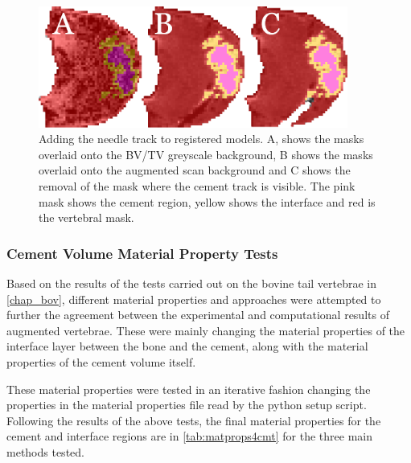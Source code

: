 \begin{figure}[ht!]
  \centering
  \includegraphics[width=4in]{Chapters/Chapter_HT_images/needle_track.png}
  \caption[Adding the needle track to registered models.]{Adding the needle
track to registered models. A, shows the masks
overlaid onto the BV/TV greyscale background, B shows the masks overlaid onto
the augmented scan background and C shows the removal of the mask where the
cement track is visible. The pink mask shows the cement region, yellow shows
the
interface and red is the vertebral mask.}
  \label{fig:needle_track}
\end{figure}

\subsubsection{Cement Volume Material Property Tests} \label{sec:cemmatprop}

Based on the results of the tests carried out on the bovine tail vertebrae in
\cref{chap_bov}, different material properties and approaches were attempted to
further the agreement between the experimental and computational results of
augmented vertebrae.  These were mainly changing the material properties of the
interface layer between the bone and the cement, along with the material
properties of the cement volume itself.

These material properties were tested in an iterative fashion changing the
properties in the material properties file read by the python setup script.
Following the results of the above tests, the final material properties for the
cement and interface regions are in \cref{tab:matprops4cmt} for the three main methods tested.

